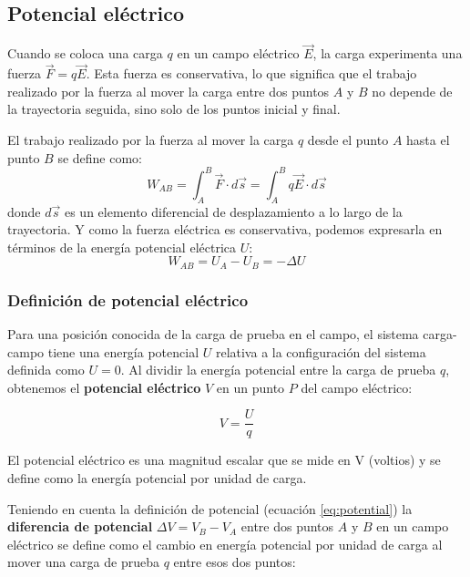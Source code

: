 \subsection{Potencial eléctrico}

Cuando se coloca una carga \(q\) en un campo eléctrico \(\vec{E}\), la carga experimenta una fuerza \(\vec{F}=q\vec{E}\). Esta fuerza es conservativa, lo que significa que el trabajo realizado por la fuerza al mover la carga entre dos puntos \(A\) y \(B\) no depende de la trayectoria seguida, sino solo de los puntos inicial y final.

El trabajo realizado por la fuerza al mover la carga \(q\) desde el punto \(A\) hasta el punto \(B\) se define como:
\begin{equation*}
    W_{AB} = \int_A^B \vec{F} \cdot d\vec{s} = \int_A^B q\vec{E} \cdot d\vec{s}
\end{equation*}
donde \(d\vec{s}\) es un elemento diferencial de desplazamiento a lo largo de la trayectoria. Y como la fuerza eléctrica es conservativa, podemos expresarla en términos de la energía potencial eléctrica \(U\):
\begin{equation*}
    W_{AB} = U_A - U_B = -\Delta U
\end{equation*}

\subsubsection{Definición de potencial eléctrico}

Para una posición conocida de la carga de prueba en el campo, el sistema carga-campo tiene una energía potencial \(U\) relativa a la configuración del sistema definida como \(U=0\). Al dividir la energía potencial entre la carga de prueba \(q\), obtenemos el \textbf{potencial eléctrico} \(V\) en un punto \(P\) del campo eléctrico:

\begin{equation}
    V = \frac{U}{q}
    \label{eq:potential}
\end{equation}

El potencial eléctrico es una magnitud escalar que se mide en \(\text{V}\) (voltios) y se define como la energía potencial por unidad de carga.

Teniendo en cuenta la definición de potencial (ecuación \eqref{eq:potential}) la \textbf{diferencia de potencial} \(\Delta V = V_B - V_A\) entre dos puntos \(A\) y \(B\) en un campo eléctrico se define como el cambio en energía potencial por unidad de carga al mover una carga de prueba \(q\) entre esos dos puntos:

